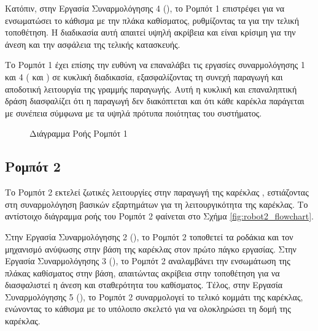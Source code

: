 Κατόπιν, στην Εργασία Συναρμολόγησης 4 (), το Ρομπότ 1 επιστρέφει για να ενσωματώσει το κάθισμα με την πλάκα καθίσματος, ρυθμίζοντας τα για την τελική τοποθέτηση. Η διαδικασία αυτή απαιτεί υψηλή ακρίβεια και είναι κρίσιμη για την άνεση και την ασφάλεια της τελικής κατασκευής.

Το Ρομπότ 1 έχει επίσης την ευθύνη να επαναλάβει τις εργασίες συναρμολόγησης 1 και 4 ( και ) σε κυκλική διαδικασία, εξασφαλίζοντας τη συνεχή παραγωγή και αποδοτική λειτουργία της γραμμής παραγωγής. Αυτή η κυκλική και επαναληπτική δράση διασφαλίζει ότι η παραγωγή δεν διακόπτεται και ότι κάθε καρέκλα παράγεται με συνέπεια σύμφωνα με τα υψηλά πρότυπα ποιότητας του συστήματος.

\begin{figure}[H]
  \centering
  \caption{Διάγραμμα Ροής Ρομπότ 1}
  \label{fig:robot1_flowchart}
\end{figure}

\subsection{Ρομπότ 2}
\noindent Το Ρομπότ 2 εκτελεί ζωτικές λειτουργίες στην παραγωγή της καρέκλας , εστιάζοντας στη συναρμολόγηση βασικών εξαρτημάτων για τη λειτουργικότητα της καρέκλας.  Το αντίστοιχο διάγραμμα ροής του Ρομπότ 2 φαίνεται στο Σχήμα \ref{fig:robot2_flowchart}.

Στην Εργασία Συναρμολόγησης 2 (), το Ρομπότ 2 τοποθετεί τα ροδάκια και τον μηχανισμό ανύψωσης στην βάση της καρέκλας στον πρώτο πάγκο εργασίας. Στην Εργασία Συναρμολόγησης 3 (), το Ρομπότ 2 αναλαμβάνει την ενσωμάτωση της πλάκας καθίσματος στην βάση, απαιτώντας ακρίβεια στην τοποθέτηση για να διασφαλιστεί η άνεση και σταθερότητα του καθίσματος. Τέλος, στην Εργασία Συναρμολόγησης 5 (), το Ρομπότ 2 συναρμολογεί το τελικό κομμάτι της καρέκλας, ενώνοντας το κάθισμα με το υπόλοιπο σκελετό για να ολοκληρώσει τη δομή της καρέκλας.


